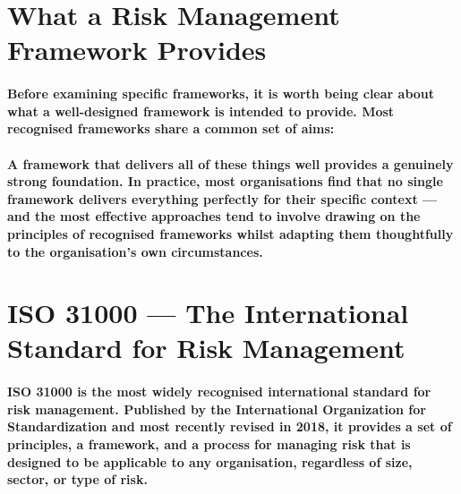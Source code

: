 \section{What a Risk Management Framework Provides}
\paragraph{Before examining specific frameworks, it is worth being clear about what a well-designed framework is intended to provide. Most recognised frameworks share a common set of aims:}
\begin{itemize}
\end{itemize}
\paragraph{A framework that delivers all of these things well provides a genuinely strong foundation. In practice, most organisations find that no single framework delivers everything perfectly for their specific context — and the most effective approaches tend to involve drawing on the principles of recognised frameworks whilst adapting them thoughtfully to the organisation's own circumstances.}

\section{ISO 31000 — The International Standard for Risk Management}
\paragraph{\textbf{ISO 31000} is the most widely recognised international standard for risk management. Published by the International Organization for Standardization and most recently revised in 2018, it provides a set of principles, a framework, and a process for managing risk that is designed to be applicable to any organisation, regardless of size, sector, or type of risk.}
